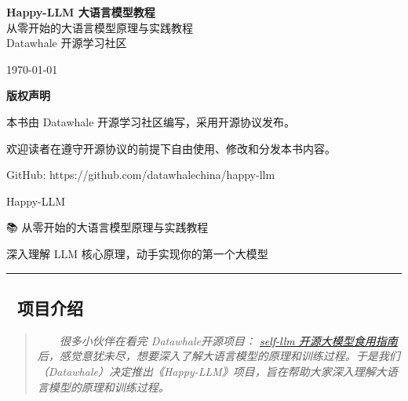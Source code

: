 \documentclass[12pt,a4paper]{book}
\begin{document}
\begin{titlepage}
    \centering
    \vspace*{2cm}
    
    {\Huge\bfseries Happy-LLM 大语言模型教程}\\[2cm]
    
    {\Large 从零开始的大语言模型原理与实践教程}\\[1cm]
    
    {\large Datawhale 开源学习社区}\\[2cm]
    
    \vfill
    
    {\large \today}
\end{titlepage}

\newpage
\thispagestyle{empty}
\vspace*{2cm}
\begin{center}
    \textbf{版权声明}
    
    \vspace{1cm}
    
    本书由 Datawhale 开源学习社区编写，采用开源协议发布。
    
    欢迎读者在遵守开源协议的前提下自由使用、修改和分发本书内容。
    
    \vspace{1cm}
    
    GitHub: https://github.com/datawhalechina/happy-llm
\end{center}

\tableofcontents
\newpage

{
\setcounter{tocdepth}{3}
\tableofcontents
}
Happy-LLM

📚 从零开始的大语言模型原理与实践教程

深入理解 LLM 核心原理，动手实现你的第一个大模型

\begin{center}\rule{0.5\linewidth}{0.5pt}\end{center}

\subsection{🎯 项目介绍}\label{ux9879ux76eeux4ecbux7ecd}

\begin{quote}
  \emph{很多小伙伴在看完 Datawhale开源项目：
\href{https://github.com/datawhalechina/self-llm}{self-llm
开源大模型食用指南}
后，感觉意犹未尽，想要深入了解大语言模型的原理和训练过程。于是我们（Datawhale）决定推出《Happy-LLM》项目，旨在帮助大家深入理解大语言模型的原理和训练过程。}
\end{quote}
\end{document}
